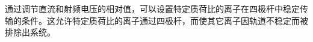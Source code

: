 \documentclass[dvipsnames, svgnames,a4paper,11pt]{article}
\begin{document}
	通过调节直流和射频电压的相对值，可以设置特定质荷比的离子在四极杆中稳定传输的条件。这允许特定质荷比的离子通过四极杆，而使其它离子因轨道不稳定而被排除出系统。






			
	
		





	

	

	
	
\end{document}
